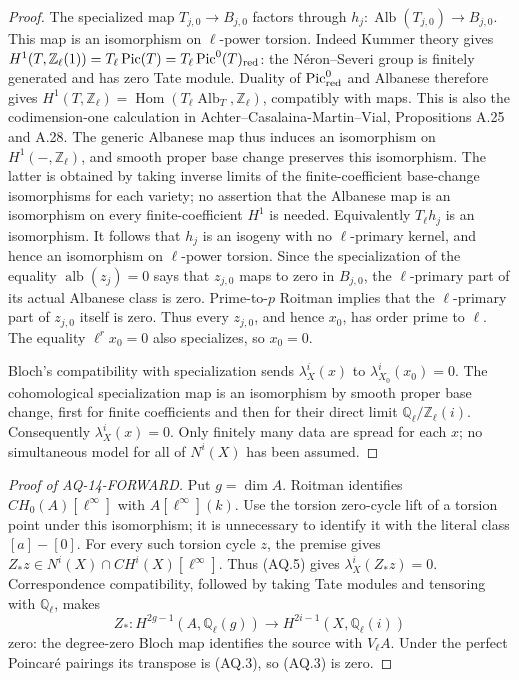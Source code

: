 \documentclass[11pt,a4paper]{article}
\theoremstyle{definition}\newtheorem{definition}[theorem]{Definition}
\theoremstyle{remark}\newtheorem{remark}[theorem]{Remark}
\begin{document}
\begin{proof}
The specialized map $T_{j,0}\to B_{j,0}$ factors through
$h_j:\operatorname{Alb}(T_{j,0})\to B_{j,0}$. This map is an
isomorphism on $\ell$-power torsion. Indeed Kummer theory gives
$H^1(T,\mathbb Z_\ell(1))=T_\ell\operatorname{Pic}(T)
=T_\ell\operatorname{Pic}^0(T)_{\rm red}$: the N\'eron--Severi
group is finitely generated and has zero Tate module.
Duality of $\operatorname{Pic}^0_{\rm red}$ and Albanese
therefore gives
$H^1(T,\mathbb Z_\ell)=\operatorname{Hom}(T_\ell
\operatorname{Alb}_T,\mathbb Z_\ell)$, compatibly with maps.
This is also the codimension-one calculation in
Achter--Casalaina-Martin--Vial, Propositions A.25 and A.28.
The generic Albanese map thus induces an isomorphism on
$H^1(-,\mathbb Z_\ell)$, and smooth proper base change
preserves this isomorphism. The latter is obtained
by taking inverse limits of the finite-coefficient base-change
isomorphisms for each variety; no assertion that the Albanese
map is an isomorphism on every finite-coefficient $H^1$ is
needed. Equivalently $T_\ell h_j$ is an isomorphism.
It follows that $h_j$ is an isogeny with no $\ell$-primary
kernel, and hence an isomorphism on $\ell$-power torsion.
Since the specialization of the equality
$\operatorname{alb}(z_j)=0$ says that $z_{j,0}$ maps to zero
in $B_{j,0}$, the $\ell$-primary part of its actual Albanese
class is zero. Prime-to-$p$ Roitman implies that the
$\ell$-primary part of $z_{j,0}$ itself is zero. Thus every
$z_{j,0}$, and hence $x_0$, has order prime to $\ell$.
The equality $\ell^r x_0=0$ also specializes, so $x_0=0$.

Bloch's compatibility with specialization sends
$\lambda_X^i(x)$ to $\lambda_{X_0}^i(x_0)=0$. The
cohomological specialization map is an isomorphism by
smooth proper base change, first for finite coefficients
and then for their direct limit $\mathbb Q_\ell/\mathbb Z_\ell(i)$.
Consequently $\lambda_X^i(x)=0$. Only finitely many data are
spread for each $x$; no simultaneous model for all of $N^i(X)$
has been assumed.
\end{proof}

\begin{proof}[Proof of AQ-14-FORWARD]
Put $g=\dim A$. Roitman identifies
$CH_0(A)[\ell^\infty]$ with $A[\ell^\infty](k)$.
Use the torsion zero-cycle lift of a torsion point under this
isomorphism; it is unnecessary to identify it with the
literal class $[a]-[0]$. For every such torsion cycle $z$,
the premise gives $Z_*z\in N^i(X)\cap CH^i(X)[\ell^\infty]$.
Thus (AQ.5) gives $\lambda_X^i(Z_*z)=0$.
Correspondence compatibility, followed by taking Tate modules
and tensoring with $\mathbb Q_\ell$, makes
\[
 Z_*:H^{2g-1}(A,\mathbb Q_\ell(g))
             \longrightarrow H^{2i-1}(X,\mathbb Q_\ell(i))
\]
zero: the degree-zero Bloch map identifies the source
with $V_\ell A$. Under the perfect Poincar\'e pairings its
transpose is (AQ.3), so (AQ.3) is zero.
\end{proof}
\end{document}
